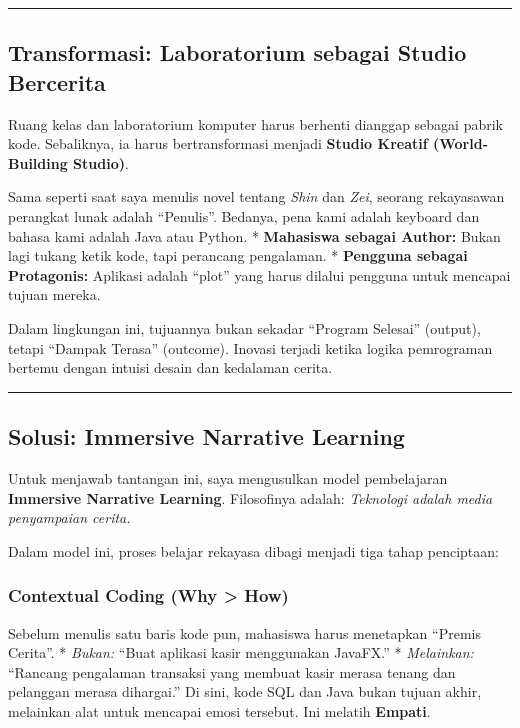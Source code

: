 \documentclass[
  letterpaper,
  DIV=11,
  numbers=noendperiod]{scrreprt}
\begin{document}
\begin{center}\rule{0.5\linewidth}{0.5pt}\end{center}

\subsection{Transformasi: Laboratorium sebagai Studio
Bercerita}\label{transformasi-laboratorium-sebagai-studio-bercerita}

Ruang kelas dan laboratorium komputer harus berhenti dianggap sebagai
pabrik kode. Sebaliknya, ia harus bertransformasi menjadi \textbf{Studio
Kreatif (World-Building Studio)}.

Sama seperti saat saya menulis novel tentang \emph{Shin} dan \emph{Zei},
seorang rekayasawan perangkat lunak adalah ``Penulis''. Bedanya, pena
kami adalah keyboard dan bahasa kami adalah Java atau Python. *
\textbf{Mahasiswa sebagai Author:} Bukan lagi tukang ketik kode, tapi
perancang pengalaman. * \textbf{Pengguna sebagai Protagonis:} Aplikasi
adalah ``plot'' yang harus dilalui pengguna untuk mencapai tujuan
mereka.

Dalam lingkungan ini, tujuannya bukan sekadar ``Program Selesai''
(output), tetapi ``Dampak Terasa'' (outcome). Inovasi terjadi ketika
logika pemrograman bertemu dengan intuisi desain dan kedalaman cerita.

\begin{center}\rule{0.5\linewidth}{0.5pt}\end{center}

\subsection{Solusi: Immersive Narrative
Learning}\label{solusi-immersive-narrative-learning}

Untuk menjawab tantangan ini, saya mengusulkan model pembelajaran
\textbf{Immersive Narrative Learning}. Filosofinya adalah:
\emph{Teknologi adalah media penyampaian cerita.}

Dalam model ini, proses belajar rekayasa dibagi menjadi tiga tahap
penciptaan:

\subsubsection{Contextual Coding (Why \textgreater{}
How)}\label{contextual-coding-why-how}

Sebelum menulis satu baris kode pun, mahasiswa harus menetapkan ``Premis
Cerita''. * \emph{Bukan:} ``Buat aplikasi kasir menggunakan JavaFX.'' *
\emph{Melainkan:} ``Rancang pengalaman transaksi yang membuat kasir
merasa tenang dan pelanggan merasa dihargai.'' Di sini, kode SQL dan
Java bukan tujuan akhir, melainkan alat untuk mencapai emosi tersebut.
Ini melatih \textbf{Empati}.
\end{document}
